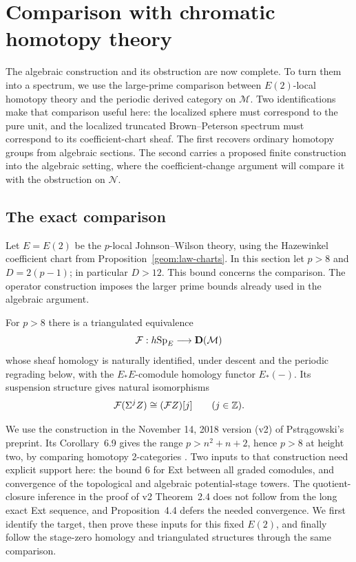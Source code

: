 \section{Comparison with chromatic homotopy theory}
\label{comp:section}

The algebraic construction and its obstruction are now complete. To
turn them into a spectrum, we use the large-prime comparison between
$E(2)$-local homotopy theory and the periodic derived category on
$\mathcal M$. Two identifications make that comparison useful here:
the localized sphere must correspond to the pure unit, and the
localized truncated Brown--Peterson spectrum must correspond to its
coefficient-chart sheaf. The first recovers ordinary homotopy groups
from algebraic sections. The second carries a proposed finite
construction into the algebraic setting, where the coefficient-change
argument will compare it with the obstruction on $\mathcal N$.

\subsection{The exact comparison}

Let $E=E(2)$ be the $p$-local Johnson--Wilson theory, using the
Hazewinkel coefficient chart from Proposition~\ref{geom:law-charts}.
In this section let $p>8$ and $D=2(p-1)$; in particular $D>12$.
This bound concerns the comparison. The operator construction imposes
the larger prime bounds already used in the algebraic argument.

\begin{theorem}
\label{comp:algebraicity}
For $p>8$ there is a triangulated equivalence
\[
 \mathcal F:h\mathrm{Sp}_E\longrightarrow \mathbf D(\mathcal M)
\]
whose sheaf homology is naturally identified, under descent and the
periodic regrading below, with the $E_*E$-comodule homology functor
$E_*(-)$. Its suspension structure
gives natural isomorphisms
\[
 \mathcal F(\Sigma^jZ)\cong(\mathcal F Z)[j]
 \qquad(j\in\mathbb Z).
\]
\end{theorem}

We use the construction in the November 14, 2018 version (v2) of
Pstr\k{a}gowski's preprint. Its Corollary~6.9 gives the range
$p>n^2+n+2$, hence $p>8$ at height two, by comparing homotopy
2-categories \cite[Corollary~6.9]{Pstragowski2021}. Two inputs to
that construction need explicit support here: the bound $6$ for Ext
between all graded comodules, and convergence of the topological and
algebraic potential-stage towers. The quotient-closure inference in
the proof of v2 Theorem~2.4 does not follow from the long exact Ext
sequence, and Proposition~4.4 defers the needed convergence. We first
identify the target, then prove these inputs for this fixed $E(2)$,
and finally follow the stage-zero homology and triangulated structures
through the same comparison.

